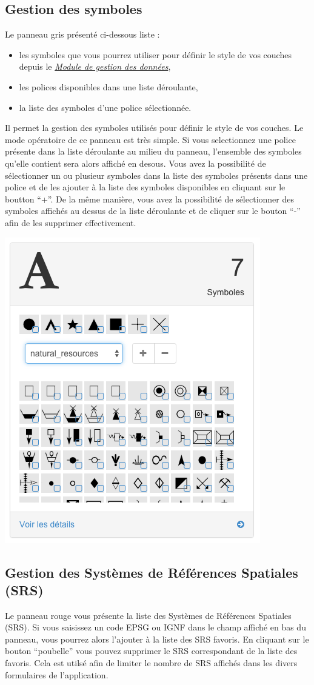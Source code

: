 \documentclass[letterpaper,10pt,french]{sphinxmanual}
\begin{document}
\subsection{Gestion des symboles}
\label{dashboard/overview:gestion-des-symboles}
Le panneau gris présenté ci-dessous liste :
\begin{itemize}
\item {} 
les symboles que vous pourrez utiliser pour définir le style de vos couches depuis le {\hyperref[data/index::doc]{\emph{\emph{Module de gestion des données}}}},

\item {} 
les polices disponibles dans une liste déroulante,

\item {} 
la liste des symboles d'une police sélectionnée.

\end{itemize}

Il permet la gestion des symboles utilisés pour définir le style de
vos couches. Le mode opératoire de ce panneau est très simple.
Si vous selectionnez une police présente dans la liste déroulante au
milieu du panneau, l'ensemble des symboles qu'elle contient sera alors
affiché en desous. Vous avez la possibilité de sélectionner un ou plusieur
symboles dans la liste des symboles présents dans une police et de les
ajouter à la liste des symboles disponibles en cliquant sur le boutton
``+''. De la même manière, vous avez la possibilité de sélectionner des
symboles affichés au dessus de la liste déroulante et de cliquer sur
le bouton ``-'' afin de les supprimer effectivement.

\includegraphics[width=0.330\linewidth]{dashboard-symbols-block.png}


\subsection{Gestion des Systèmes de Références Spatiales (SRS)}
\label{dashboard/overview:gestion-des-systemes-de-references-spatiales-srs}
Le panneau rouge vous présente la liste des Systèmes de Références
Spatiales (SRS). Si vous saisissez un code EPSG ou IGNF dans le champ
affiché en bas du panneau, vous pourrez alors l'ajouter à la liste des
SRS favoris. En cliquant sur le bouton ``poubelle'' vous pouvez
supprimer le SRS correspondant de la liste des favoris. Cela est
utilsé afin de limiter le nombre de SRS affichés dans les divers
formulaires de l'application.
\end{document}
